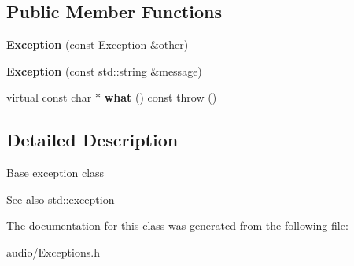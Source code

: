 \subsection*{Public Member Functions}
\begin{DoxyCompactItemize}
\item 
{\bfseries Exception} (const \hyperlink{classAudio_1_1Exception}{Exception} \&other)\hypertarget{classAudio_1_1Exception_a1a02fa22af4bdf2e9ed213aa6be81a2a}{}\label{classAudio_1_1Exception_a1a02fa22af4bdf2e9ed213aa6be81a2a}

\item 
{\bfseries Exception} (const std\+::string \&message)\hypertarget{classAudio_1_1Exception_ae7fcbd2a69030427df2bea53b042ee66}{}\label{classAudio_1_1Exception_ae7fcbd2a69030427df2bea53b042ee66}

\item 
virtual const char $\ast$ {\bfseries what} () const   throw ()\hypertarget{classAudio_1_1Exception_a939257eebd97683e49e9185dfcc425a8}{}\label{classAudio_1_1Exception_a939257eebd97683e49e9185dfcc425a8}

\end{DoxyCompactItemize}


\subsection{Detailed Description}
Base exception class

\begin{DoxySeeAlso}{See also}
std\+::exception 
\end{DoxySeeAlso}


The documentation for this class was generated from the following file\+:\begin{DoxyCompactItemize}
\item 
audio/Exceptions.\+h\end{DoxyCompactItemize}
